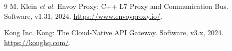 \documentclass[sigconf,anonymous]{acmart}
\begin{document}
\begin{thebibliography}{9}
M. Klein \emph{et al.}
\newblock Envoy Proxy: C++ L7 Proxy and Communication Bus.
\newblock Software, v1.31, 2024.
\newblock \url{https://www.envoyproxy.io/}.

Kong Inc.
\newblock Kong: The Cloud-Native API Gateway.
\newblock Software, v3.x, 2024.
\newblock \url{https://konghq.com/}.
\end{thebibliography}
\end{document}

